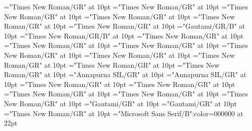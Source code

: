 \documentclass[a4paper]{article}
\begin{document}
\font\spanentranslationLdtetranslationsexamplessensesensesentryletData="Times New Roman/GR" at 10pt
\font\complexformrefsentryletData="Times New Roman/GR" at 10pt
\font\complexformtypecomplexformrefsentryletData="Times New Roman/GR" at 10pt
\font\LexEntryTypepublishStemComplexFormTypeReverseAbbrPubencomplexformtypecomplexformrefsentryletData="Times New Roman/GR" at 10pt
\font\spanenLexEntryTypepublishStemComplexFormTypeReverseAbbrPubencomplexformtypecomplexformrefsentryletData="Times New Roman/GR" at 10pt
\font\spanencomplexformtypecomplexformrefsentryletData="Times New Roman/GR" at 10pt
\font\complexformformggoTeluINcomplexformrefsentryletData="Gautami/GR/B" at 10pt
\font\spanencomplexformformggoTeluINcomplexformrefsentryletData="Times New Roman/GR/B" at 10pt
\font\spanencomplexformrefsentryletData="Times New Roman/GR" at 10pt
\font\pictureRightentryletData="Times New Roman/GR" at 10pt
\font\picturepictureRightentryletData="Times New Roman/GR" at 10pt
\font\pictureCaptionpictureRightentryletData="Times New Roman/GR" at 10pt
\font\CmPicturepublishStemPileThumbnailPubpictureCaptionpictureRightentryletData="Times New Roman/GR" at 10pt
\font\spanenCmPicturepublishStemPileThumbnailPubpictureCaptionpictureRightentryletData="Times New Roman/GR" at 10pt
\font\pictureLabelenpictureCaptionpictureRightentryletData="Times New Roman/GR" at 10pt
\font\spanenpictureLabelenpictureCaptionpictureRightentryletData="Times New Roman/GR" at 10pt
\font\LexSensepublishStemGlossPubLehisensesensesentryletData="Annapurna SIL/GR" at 10pt
\font\spanhiLexSensepublishStemGlossPubLehisensesensesentryletData="Annapurna SIL/GR" at 10pt
\font\spanenLexSensepublishStemGlossPubLehisensesensesentryletData="Times New Roman/GR" at 10pt
\font\translationentranslationsexamplessensesensesentryletData="Times New Roman/GR" at 10pt
\font\xitementranslationentranslationsexamplessensesensesentryletData="Times New Roman/GR" at 10pt
\font\spanenxitementranslationentranslationsexamplessensesensesentryletData="Times New Roman/GR" at 10pt
\font\spanentranslationentranslationsexamplessensesensesentryletData="Times New Roman/GR" at 10pt
\font\xitemtetranslationentranslationsexamplessensesensesentryletData="Gautami/GR" at 10pt
\font\spantexitemtetranslationentranslationsexamplessensesensesentryletData="Gautami/GR" at 10pt
\font\spanenentryletData="Times New Roman/GR" at 10pt
\color{black} 
\thispagestyle{empty} 
\font\CoverPageTitle="Microsoft Sans Serif/B":color=000000 at 22pt 
\end{document}
